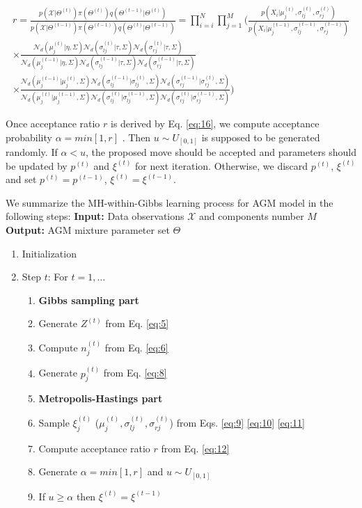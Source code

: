 \begin{multline}
r = \frac{p(\mathcal{X}|\Theta^{(t)})\pi(\Theta^{(t)})q(\Theta^{(t-1)}|\Theta^{(t)})}{p(\mathcal{X}|\Theta^{(t-1)})\pi(\Theta^{(t-1)})q(\Theta^{(t)}|\Theta^{(t-1)})} = \prod_{i=i}^N \prod_{j=1}^M(\frac{p(X_i|\mu_j^{(t)},\sigma_{lj}^{(t)},\sigma_{rj}^{(t)})}
{p(X_i|\mu_j^{(t-1)},\sigma_{lj}^{(t-1)},\sigma_{rj}^{(t-1)})} \\
\times \frac{\mathcal{N}_d(\mu_j^{(t)}|\eta,\Sigma)\mathcal{N}_d(\sigma_{lj}^{(t)}|\tau,\Sigma)\mathcal{N}_d(\sigma_{rj}^{(t)}|\tau,\Sigma)}{\mathcal{N}_d(\mu_j^{(t-1)}|\eta,\Sigma)\mathcal{N}_d(\sigma_{lj}^{(t-1)}|\tau,\Sigma)\mathcal{N}_d(\sigma_{rj}^{(t-1)}|\tau,\Sigma)} \\
\times \frac{\mathcal{N}_d(\mu_j^{(t-1)}|\mu_j^{(t)},\Sigma)\mathcal{N}_d(\sigma_{lj}^{(t-1)}|\sigma_{lj}^{(t)},\Sigma)\mathcal{N}_d(\sigma_{rj}^{(t-1)}|\sigma_{rj}^{(t)},\Sigma)}{\mathcal{N}_d(\mu_j^{(t)}|\mu_j^{(t-1)},\Sigma)\mathcal{N}_d(\sigma_{lj}^{(t)}|\sigma_{lj}^{(t-1)},\Sigma)\mathcal{N}_d(\sigma_{rj}^{(t)}|\sigma_{rj}^{(t-1)},\Sigma)})
\label{eq:16}
\end{multline}
    
Once acceptance ratio $r$ is derived by Eq. \eqref{eq:16}, we compute acceptance probability $\alpha = min[1,r]$ \cite{Luengo2013}. Then $u \sim U_{[0,1]}$ is supposed to be generated randomly. If $\alpha < u$, the proposed move should be accepted and parameters should be updated by $p^{(t)}$ and $\xi^{(t)}$ for next iteration. Otherwise, we discard $p^{(t)}$, $\xi^{(t)}$ and set $p^{(t)} = p^{(t-1)}$, $\xi^{(t)} = \xi^{(t-1)}$.

We summarize the MH-within-Gibbs learning process for AGM model in the following steps:
\bigbreak
\noindent\textbf{Input:} Data observations $\mathcal{X}$ and components number $M$ \\
\textbf{Output:} AGM mixture parameter set $\Theta$
\bigbreak

\begin{enumerate}
\item Initialization
\item Step $t$: For $t = 1,\ldots$
\begin{enumerate}
\item[]\textbf{Gibbs sampling part}
\item Generate $Z^{(t)}$ from Eq. \eqref{eq:5}
\item Compute $n_j^{(t)}$ from Eq. \eqref{eq:6}
\item Generate $p_j^{(t)}$ from Eq. \eqref{eq:8}
\item[] \textbf{Metropolis-Hastings part}
\item Sample $\xi_j^{(t)}$ ($\mu_j^{(t)}, \sigma_{lj}^{(t)}, \sigma_{rj}^{(t)}$) from Eqs. \eqref{eq:9} \eqref{eq:10} \eqref{eq:11}
\item Compute acceptance ratio $r$ from Eq. \eqref{eq:12}
\item Generate $\alpha = min[1,r]$ and $u \sim U_{[0,1]}$
\item If $u \geq \alpha$ then $\xi^{(t)} = \xi^{(t-1)}$
\end{enumerate}
\end{enumerate}
\bigskip

